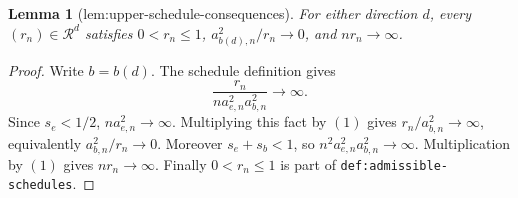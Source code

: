 \documentclass{article}
\newtheorem{lemma}{Lemma}
\begin{document}
\begin{lemma}[lem:upper-schedule-consequences]\label{lem:upper-schedule-consequences}
For either direction \(d\), every \((r_n)\in\mathcal R^d\) satisfies \(0<r_n\le1\), \(a_{b(d),n}^2/r_n\to0\), and \(nr_n\to\infty\).
\end{lemma}
\begin{proof}
Write \(b=b(d)\). The schedule definition gives
\[\frac{r_n}{na_{e,n}^2a_{b,n}^2}\longrightarrow\infty.\tag{1}\]
Since \(s_e<1/2\), \(na_{e,n}^2\to\infty\). Multiplying this fact by \((1)\) gives \(r_n/a_{b,n}^2\to\infty\), equivalently \(a_{b,n}^2/r_n\to0\). Moreover \(s_e+s_b<1\), so \(n^2a_{e,n}^2a_{b,n}^2\to\infty\). Multiplication by \((1)\) gives \(nr_n\to\infty\). Finally \(0<r_n\le1\) is part of \texttt{def:admissible-schedules}.
\end{proof}
\end{document}

